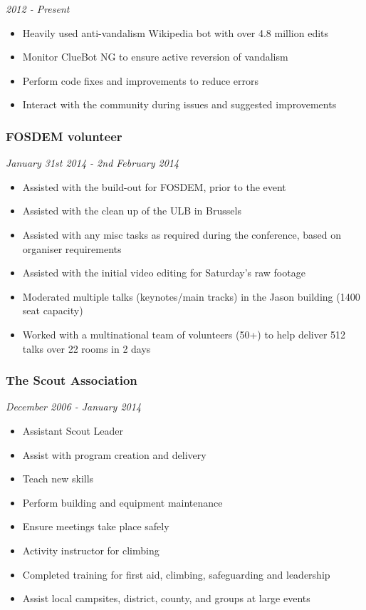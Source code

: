 \emph{2012 - Present}

\begin{itemize}
\itemsep1pt\parskip0pt
\item
  Heavily used anti-vandalism Wikipedia bot with over 4.8 million edits
\item
  Monitor ClueBot NG to ensure active reversion of vandalism
\item
  Perform code fixes and improvements to reduce errors
\item
  Interact with the community during issues and suggested improvements
\end{itemize}

\subsubsection{FOSDEM volunteer}\label{fosdem-volunteer}

\emph{January 31st 2014 - 2nd February 2014}

\begin{itemize}
\itemsep1pt\parskip0pt
\item
  Assisted with the build-out for FOSDEM, prior to the event
\item
  Assisted with the clean up of the ULB in Brussels
\item
  Assisted with any misc tasks as required during the conference, based
  on organiser requirements
\item
  Assisted with the initial video editing for Saturday's raw footage
\item
  Moderated multiple talks (keynotes/main tracks) in the Jason building
  (1400 seat capacity)
\item
  Worked with a multinational team of volunteers (50+) to help deliver
  512 talks over 22 rooms in 2 days
\end{itemize}

\subsubsection{The Scout Association}\label{the-scout-association}

\emph{December 2006 - January 2014}

\begin{itemize}
\itemsep1pt\parskip0pt
\item
  Assistant Scout Leader
\item
  Assist with program creation and delivery
\item
  Teach new skills
\item
  Perform building and equipment maintenance
\item
  Ensure meetings take place safely
\item
  Activity instructor for climbing
\item
  Completed training for first aid, climbing, safeguarding and
  leadership
\item
  Assist local campsites, district, county, and groups at large events
\end{itemize}

